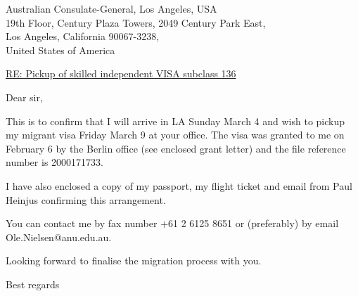 \documentclass[12pt]{letter}
\begin{document}
\address{Ole M{\o}ller Nielsen     \\
         28 Scrivener Street   \\
         O'Connor, ACT 2602 \\
         Canberra \\
         Australia}


\signature{Ole M{\o}ller Nielsen}

\begin{letter}
{Australian Consulate-General, Los Angeles, USA \\
 19th Floor, Century Plaza Towers, 2049 Century Park East, \\
 Los Angeles, California 90067-3238,\\
 United States of America}

 
\opening{\underline{RE: Pickup of skilled independent VISA subclass 136}}

Dear sir,

This is to confirm that I will arrive in LA Sunday March 4 and wish to pickup
my migrant visa Friday March 9 at your office.
The visa was granted to me on February 6 by the Berlin office (see enclosed grant letter)
and the file reference number is 2000171733.

I have also enclosed a copy of my passport, my flight ticket and email from
Paul Heinjus confirming this arrangement.

You can contact me by fax number +61 2 6125 8651
or (preferably) by email Ole.Nielsen@anu.edu.au.


Looking forward to finalise the migration process with you.

\closing{Best regards}

\end{letter}
\end{document}
